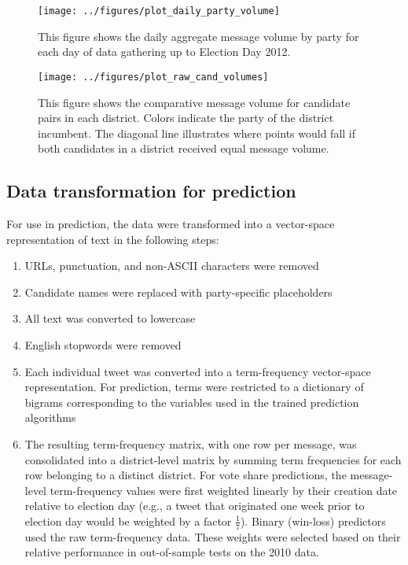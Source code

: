 \documentclass[11pt]{article}
\begin{document}

\begin{figure}[ht]
  \centering
  \texttt{[image: ../figures/plot\_daily\_party\_volume]}
  \caption{This figure shows the daily aggregate message volume by 
party for each day of data gathering up to Election Day 2012.}
  \label{fig:daily-msg-volume}
\end{figure}

\begin{figure}[ht]
  \centering
  \texttt{[image: ../figures/plot\_raw\_cand\_volumes]}
  \caption{This figure shows the comparative message volume for
    candidate pairs in each district. Colors indicate the party of the
    district incumbent. The diagonal line illustrates where points would fall if both candidates in a district received equal message volume.}
  \label{fig:cand-msg-volume}
\end{figure}


\subsection{Data transformation for prediction}
\label{sec:data-transf-pred}

For use in prediction, the data were transformed into a vector-space
representation of text in the following steps:
\begin{enumerate}
\item URLs, punctuation, and non-ASCII characters were removed
\item Candidate names were replaced with party-specific placeholders
\item All text was converted to lowercase
\item English stopwords were removed
\item Each individual tweet was converted into a term-frequency
  vector-space representation. For prediction, terms were restricted
  to a dictionary of bigrams corresponding to the variables used in
  the trained prediction algorithms
\item The resulting term-frequency matrix, with one row per message,
  was consolidated into a district-level matrix by summing term
  frequencies for each row belonging to a distinct district. For
  vote share predictions, the message-level term-frequency values were
  first weighted linearly by their creation date relative to election
  day (e.g., a tweet that originated one week prior to election day
  would be weighted by a factor $\frac{1}{7}$). Binary (win-loss)
  predictors used the raw term-frequency data. These weights were
  selected based on their relative performance in out-of-sample tests
  on the 2010 data. 
\end{enumerate}
\end{document}
